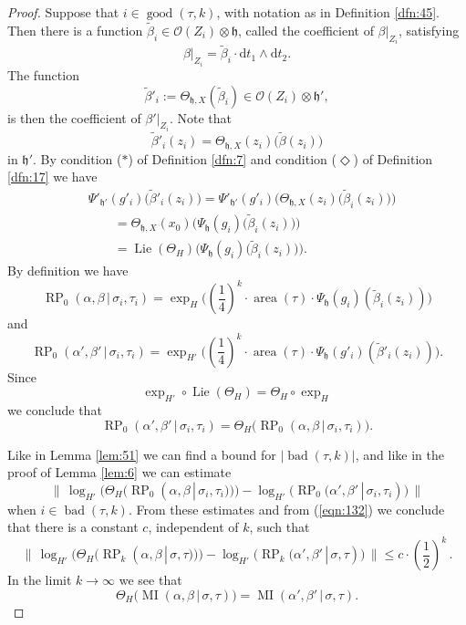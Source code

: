 \documentclass[10pt, a4paper]{amsart}
\theoremstyle{definition}
\numberwithin{equation}{section}
\newcommand{\opn}{\operatorname}
\newcommand{\mfrak}[1]{\mathfrak{#1}}
\newcommand{\mcal}[1]{\mathcal{#1}}
\newcommand{\mrm}[1]{\mathrm{#1}}
\newcommand{\smfrac}[2]{{\textstyle \frac{#1}{#2}}}
\newcommand{\til}[1]{\tilde{#1}}
\newcommand{\Norm}[1]{\bigl\lVert\, #1 \, \bigr\rVert}
\newcommand{\abs}[1]{\lvert #1 \rvert}
\renewcommand{\vert}{\, | \,}
\newcommand{\h}{\mfrak{h}}
\renewcommand{\d}{\mrm{d}}
\begin{document}
\begin{proof}
Suppose that $i \in \opn{good}(\tau, k)$, with notation as in 
Definition \ref{dfn:45}. Then there is a function 
$\til{\beta}_i \in \mcal{O}(Z_i) \otimes \h$,
called the coefficient of $\beta|_{Z_i}$, satisfying
\[ \beta|_{Z_i} = \til{\beta}_i \cdot \d t_1 \wedge \d t_2 . \]
The function 
\[ \til{\beta}'_i := \Theta_{\h, X}(\til{\beta}_i) \in \mcal{O}(Z_i) \otimes
\h' , \]
is then the coefficient of $\beta'|_{Z_i}$.
Note that 
\[  \til{\beta}'_i(z_i) = \Theta_{\h, X}(z_i) \bigl( \til{\beta}(z_i) \bigr) \]
in $\h'$. By condition ($*$) of Definition \ref{dfn:7} and condition
($\Diamond$) of Definition \ref{dfn:17} we have
\[ \begin{aligned}
& \Psi'_{\h'}(g'_i) \bigl( \til{\beta}'_i(z_i) \bigr) = 
\Psi'_{\h'}(g'_i) \bigl(  \Theta_{\h, X}(z_i) \bigl( \til{\beta}_i(z_i) \bigr)
\bigr) \\
& \qquad = \Theta_{\h, X}(x_0) \bigl( \Psi_{\h}(g_i)
\bigl( \til{\beta}_i(z_i) \bigr) \bigr) \\
& \qquad = \opn{Lie}(\Theta_H)
\bigl( \Psi_{\h}(g_i) \bigl( \til{\beta}_i(z_i) \bigr) \bigr) . 
\end{aligned} \]
By definition we have
\[ \opn{RP}_0(\alpha, \beta \vert \sigma_i, \tau_i) = 
\exp_H \bigl( (\smfrac{1}{4})^k \cdot \opn{area}(\tau) \cdot 
\Psi_{\h}(g_i)(\til{\beta}_i(z_i)) \bigr) \]
and
\[ \opn{RP}_0(\alpha', \beta' \vert \sigma_i, \tau_i) = 
\exp_{H'} \bigl( (\smfrac{1}{4})^k \cdot \opn{area}(\tau) \cdot 
\Psi_{\h}(g'_i)(\til{\beta}'_i(z_i)) \bigr) . \]
Since
\[ \exp_{H'} \circ \opn{Lie}(\Theta_H) = \Theta_H \circ \exp_H \]
we conclude that 
\begin{equation} \label{eqn:132}
\opn{RP}_0(\alpha', \beta' \vert \sigma_i, \tau_i) =
\Theta_H \bigl( \opn{RP}_0(\alpha, \beta \vert \sigma_i, \tau_i) \bigr) . 
\end{equation}

Like in Lemma \ref{lem:51} we can find a bound for
$\abs{ \opn{bad}(\tau, k) }$, and like in the proof of Lemma \ref{lem:6}
we can estimate 
\[ \Norm{ \log_{H'} \bigl( \Theta_H \bigl(  
\opn{RP}_0 ( \alpha, \beta \vert \sigma_i, \tau_i)  \bigr) \bigr) -
\log_{H'} \bigl( 
\opn{RP}_0 \bigl( \alpha', \beta' \vert \sigma_i, \tau_i) \bigr) }  \]
when $i \in \opn{bad}(\tau, k)$. 
From these estimates and from (\ref{eqn:132}) 
we conclude that there is a constant $c$, independent of
$k$, such that
\[  \Norm{ \log_{H'} \bigl( \Theta_H \bigl(
\opn{RP}_k ( \alpha, \beta \vert \sigma, \tau)  \bigr) \bigr) -
\log_{H'} \bigl( 
\opn{RP}_k \bigl( \alpha', \beta' \vert \sigma, \tau) \bigr) } 
\leq c \cdot (\smfrac{1}{2})^k \, . \]
In the limit $k \to \infty$ we see that
\[ \Theta_H \bigl( \opn{MI} (\alpha, \beta \vert \sigma, \tau) \bigr) =
\opn{MI} (\alpha', \beta' \vert \sigma, \tau). \]
\end{proof}
\end{document}

